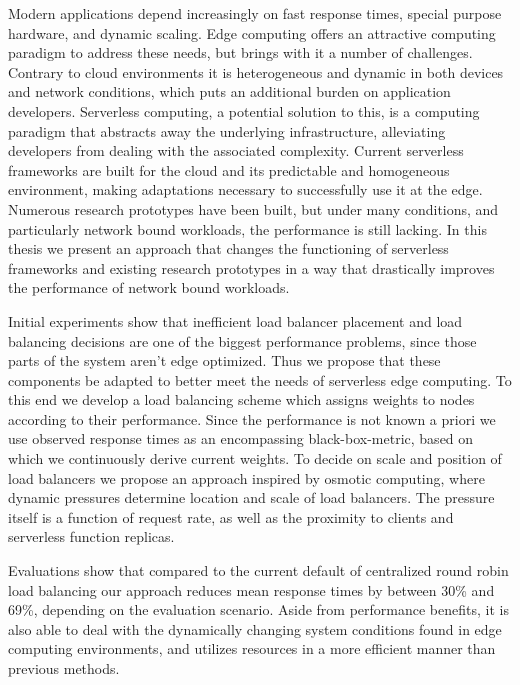 Modern applications depend increasingly on fast response times, special purpose hardware, and dynamic scaling.
Edge computing offers an attractive computing paradigm to address these needs, but brings with it a number of challenges. Contrary to cloud environments it is heterogeneous and dynamic in both devices and network conditions, which puts an additional burden on application developers.
Serverless computing, a potential solution to this, is a computing paradigm that abstracts away the underlying infrastructure, alleviating developers from dealing with the associated complexity.
Current serverless frameworks are built for the cloud and its predictable and homogeneous environment, making adaptations necessary to successfully use it at the edge.
Numerous research prototypes have been built, but under many conditions, and particularly network bound workloads, the performance is still lacking.
In this thesis we present an approach that changes the functioning of serverless frameworks and existing research prototypes in a way that drastically improves the performance of network bound workloads.

Initial experiments show that inefficient load balancer placement and load balancing decisions are one of the biggest performance problems, since those parts of the system aren't edge optimized.
Thus we propose that these components be adapted to better meet the needs of serverless edge computing.
To this end we develop a load balancing scheme which assigns weights to nodes according to their performance. Since the performance is not known a priori we use observed response times as an encompassing black-box-metric, based on which we continuously derive current weights.
To decide on scale and position of load balancers we propose an approach inspired by osmotic computing, where dynamic pressures determine location and scale of load balancers. The pressure itself is a function of request rate, as well as the proximity to clients and serverless function replicas.

Evaluations show that compared to the current default of centralized round robin load balancing our approach reduces mean response times by between 30\% and 69\%, depending on the evaluation scenario.
Aside from performance benefits, it is also able to deal with the dynamically changing system conditions found in edge computing environments, and utilizes resources in a more efficient manner than previous methods.